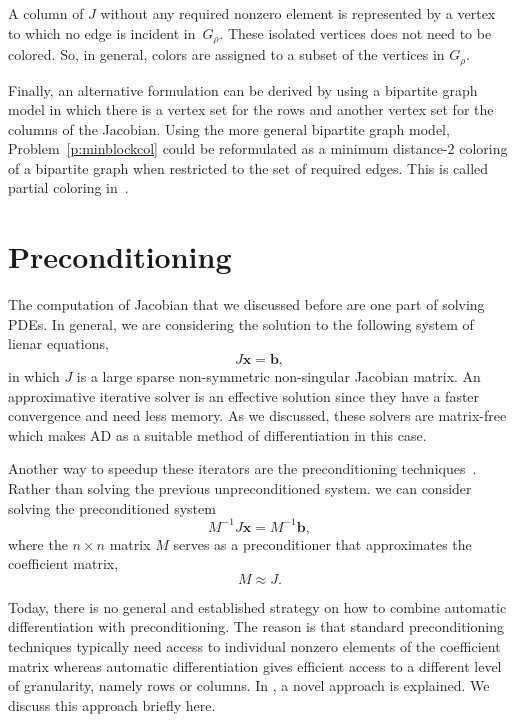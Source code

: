 \documentclass[12pt, oneside]{book}
\newcommand{\vek}[1]{{\ensuremath{\mathbf #1}}}
\newcommand{\sparsifysymbol}{\ensuremath{\rho}}
\begin{document}
A column of $J$ without any required nonzero element is represented by a vertex to which
no edge is incident in~$G_\sparsifysymbol$. These isolated vertices does not need to be
colored. So, in general, colors are assigned to a subset of the vertices in
$G_\sparsifysymbol$.

Finally, an alternative formulation can be derived by using a bipartite graph model in
which there is a vertex set for the rows and another vertex set for the columns of the
Jacobian. Using the more general bipartite graph model, Problem~\ref{p:minblockcol} could
be reformulated as a minimum distance-2 coloring of a bipartite graph when restricted to
the set of required edges. This is called partial coloring in~\cite{Gebremedhin05whatcolor}.

\section{Preconditioning}
\label{precond}
The computation of Jacobian that we discussed before are one part of solving PDEs. 
In general, we are considering the solution to the following system of lienar equations,
$$
J\vek{x} = \vek{b},
$$
in which $J$ is a large sparse non-symmetric non-singular Jacobian matrix. An approximative iterative solver is an
effective solution since they have a faster convergence and need less memory. As we discussed,
these solvers are matrix-free which makes AD as a suitable method of differentiation in this case.

Another way to speedup these iterators are 
the preconditioning techniques~\cite{precond1,precond2}.
Rather than solving the previous unpreconditioned system. 
we can consider solving the preconditioned system
\begin{equation}
\label{e:precond}
M^{-1} J \vek{x}= M^{-1}\vek{b},
\end{equation}
where the $n \times n$ matrix $M$ serves as a preconditioner that approximates
the coefficient matrix,
$$
M \approx J.
$$

Today, there is no general and established
strategy on how to combine automatic differentiation with preconditioning. The reason is
that standard preconditioning techniques typically need access to individual nonzero
elements of the coefficient matrix whereas automatic differentiation gives efficient
access to a different level of granularity, namely rows or columns.
In \cite{Lulfesmann2012Fap}, a novel approach is explained.
We discuss this approach briefly here.
\end{document}
